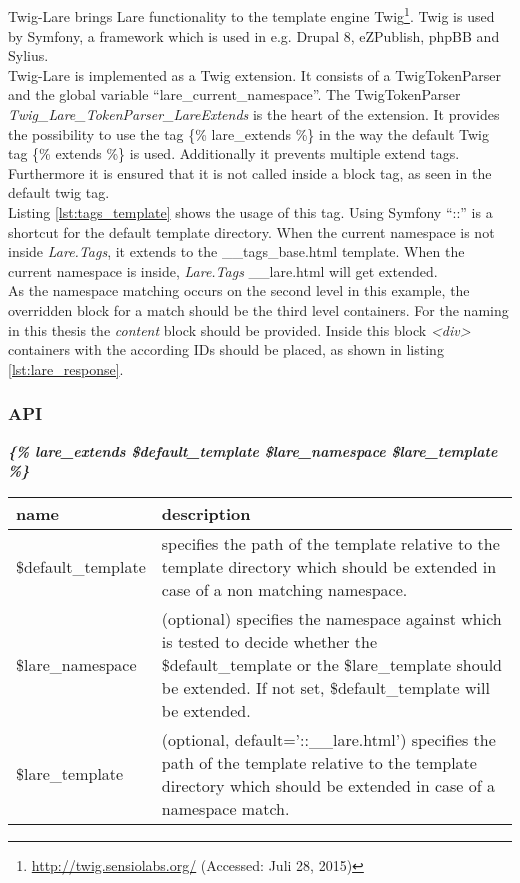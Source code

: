 \subsection{\twigLare{}}
Twig-Lare brings Lare functionality to the template engine Twig\footnote{\url{http://twig.sensiolabs.org/} (Accessed: Juli 28, 2015)}.
Twig is used by Symfony, a framework which is used in e.g. Drupal 8, eZPublish, phpBB and Sylius.
\\
Twig-Lare is implemented as a Twig extension.
It consists of a TwigTokenParser and the global variable \enquote{lare\_current\_namespace}.
The TwigTokenParser \emph{Twig\_Lare\_TokenParser\_LareExtends} is the heart of the extension.
It provides the possibility to use the tag \{\% lare\_extends \%\} in the way the default Twig tag \{\% extends \%\} is used.
Additionally it prevents multiple extend tags.
Furthermore it is ensured that it is not called inside a block tag, as seen in the default twig tag.
\\
Listing \ref{lst:tags_template} shows the usage of this tag.
Using Symfony \enquote{::} is a shortcut for the default template directory.
When the current namespace is not inside \emph{Lare.Tags}, it extends to the \_\_tags\_base.html template.
When the current namespace is inside, \emph{Lare.Tags} \_\_lare.html will get extended.
\\
As the namespace matching occurs on the second level in this example, the overridden block for a match should be the third level containers.
For the naming in this thesis the \emph{content} block should be provided.
Inside this block \emph{<div>} containers with the according IDs should be placed, as shown in listing \ref{lst:lare_response}.

\subsubsection{API}

\large{\textbf{\textit{\{\% lare\_extends \$default\_template \$lare\_namespace \$lare\_template \%\}}}}
\\
\begin{tabular}{|p{4cm}|p{9.3cm}|}
    \hline
    \textbf{name} & \textbf{description} \\
    \hline
    \$default\_template & specifies the path of the template relative to the template directory which should be extended in case of a non matching namespace. \\
    \hline
    \$lare\_namespace & (optional) specifies the namespace against which is tested to decide whether the \$default\_template or the \$lare\_template should be extended. If not set, \$default\_template will be extended. \\
    \hline
    \$lare\_template & (optional, default='::\_\_lare.html') specifies the path of the template relative to the template directory which should be extended in case of a name\-space match. \\
    \hline
\end{tabular}

